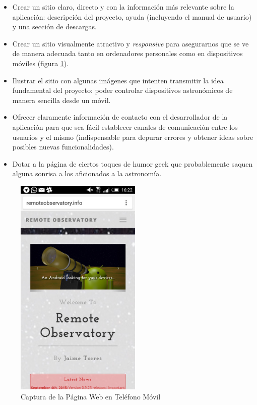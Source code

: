 \begin{itemize}
  \item Crear un sitio claro, directo y con la información más relevante sobre la aplicación: descripción del proyecto, ayuda (incluyendo el manual de usuario) y una sección de descargas.
  
  \item Crear un sitio visualmente atractivo y \textit{responsive} para asegurarnos que se ve de manera adecuada tanto en ordenadores personales como en dispositivos móviles (figura \ref{fig:webMovil}).
  
  \item Ilustrar el sitio con algunas imágenes que intenten transmitir la idea fundamental del proyecto: poder controlar dispositivos astronómicos de manera sencilla desde un móvil.
  
  \item Ofrecer claramente información de contacto con el desarrollador de la aplicación para que sea fácil establecer canales de comunicación entre los usuarios y el mismo (indispensable para depurar errores y obtener ideas sobre posibles nuevas funcionalidades).
  
  \item Dotar a la página de ciertos toques de humor geek que probablemente saquen alguna sonrisa a los aficionados a la astronomía.
\end{itemize}


\begin{figure}
 \centering
 \includegraphics[width=6cm]{../images/webMovil.jpg}
 \caption{Captura de la Página Web en Teléfono Móvil}
 \label{fig:webMovil}
\end{figure}

